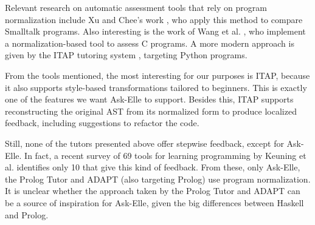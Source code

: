 
Relevant research on automatic assessment tools that rely on program normalization include Xu and Chee's work \cite{2003transformation}, who apply this method to compare Smalltalk programs. Also interesting is the work of Wang et al. \cite{2007wang}, who implement a normalization-based tool to assess C programs. A more modern approach is given by the ITAP tutoring system \cite{2017ITAP}, targeting Python programs.

From the tools mentioned, the most interesting for our purposes is ITAP, because it also supports style-based transformations tailored to beginners. This is exactly one of the features we want Ask-Elle to support. Besides this, ITAP supports reconstructing the original AST from its normalized form to produce localized feedback, including suggestions to refactor the code.

Still, none of the tutors presented above offer stepwise feedback, except for Ask-Elle. In fact, a recent survey of 69 tools for learning programming by Keuning et al. \cite{2016feedbackreview} identifies only 10 that give this kind of feedback. From these, only Ask-Elle, the Prolog Tutor \cite{2004hong} and ADAPT \cite{1992adapt} (also targeting Prolog) use program normalization. It is unclear whether the approach taken by the Prolog Tutor and ADAPT can be a source of inspiration for Ask-Elle, given the big differences between Haskell and Prolog.





